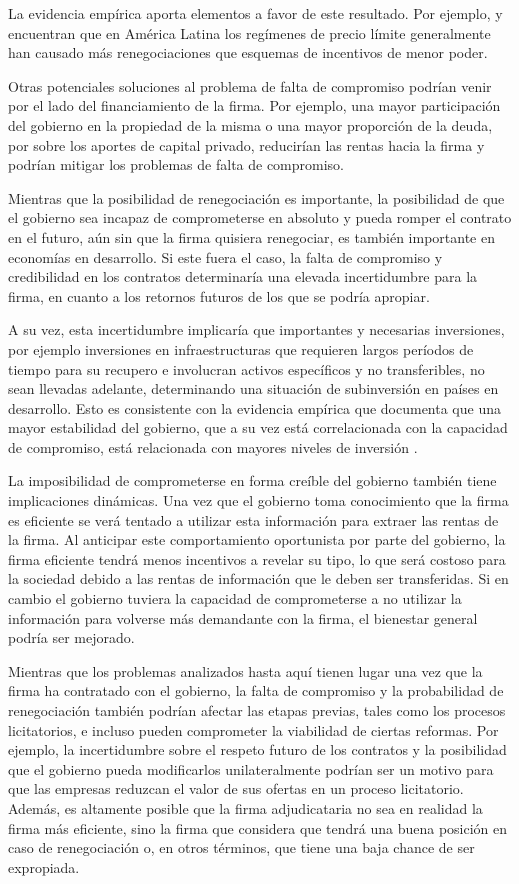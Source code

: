 \documentclass[
  12pt,
  spanish,
]{book}
\begin{document}
La evidencia empírica aporta elementos a favor de este resultado. Por ejemplo, \citet{Guasch2007} y \citet{Guasch2008} encuentran que en América Latina los regímenes de precio límite generalmente han causado más renegociaciones que esquemas de incentivos de menor poder.

Otras potenciales soluciones al problema de falta de compromiso podrían venir por el lado del financiamiento de la firma. Por ejemplo, una mayor participación del gobierno en la propiedad de la misma o una mayor proporción de la deuda, por sobre los aportes de capital privado, reducirían las rentas hacia la firma y podrían mitigar los problemas de falta de compromiso.

Mientras que la posibilidad de renegociación es importante, la posibilidad de que el gobierno sea incapaz de comprometerse en absoluto y pueda romper el contrato en el futuro, aún sin que la firma quisiera renegociar, es también importante en economías en desarrollo. Si este fuera el caso, la falta de compromiso y credibilidad en los contratos determinaría una elevada incertidumbre para la firma, en cuanto a los retornos futuros de los que se podría apropiar.

A su vez, esta incertidumbre implicaría que importantes y necesarias inversiones, por ejemplo inversiones en infraestructuras que requieren largos períodos de tiempo para su recupero e involucran activos específicos y no transferibles, no sean llevadas adelante, determinando una situación de subinversión en países en desarrollo. Esto es consistente con la evidencia empírica que documenta que una mayor estabilidad del gobierno, que a su vez está correlacionada con la capacidad de compromiso, está relacionada con mayores niveles de inversión \citep{Banerjee2006}.

La imposibilidad de comprometerse en forma creíble del gobierno también tiene implicaciones dinámicas. Una vez que el gobierno toma conocimiento que la firma es eficiente se verá tentado a utilizar esta información para extraer las rentas de la firma. Al anticipar este comportamiento oportunista por parte del gobierno, la firma eficiente tendrá menos incentivos a revelar su tipo, lo que será costoso para la sociedad debido a las rentas de información que le deben ser transferidas. Si en cambio el gobierno tuviera la capacidad de comprometerse a no utilizar la información para volverse más demandante con la firma, el bienestar general podría ser mejorado.

Mientras que los problemas analizados hasta aquí tienen lugar una vez que la firma ha contratado con el gobierno, la falta de compromiso y la probabilidad de renegociación también podrían afectar las etapas previas, tales como los procesos licitatorios, e incluso pueden comprometer la viabilidad de ciertas reformas. Por ejemplo, la incertidumbre sobre el respeto futuro de los contratos y la posibilidad que el gobierno pueda modificarlos unilateralmente podrían ser un motivo para que las empresas reduzcan el valor de sus ofertas en un proceso licitatorio. Además, es altamente posible que la firma adjudicataria no sea en realidad la firma más eficiente, sino la firma que considera que tendrá una buena posición en caso de renegociación o, en otros términos, que tiene una baja chance de ser expropiada.
\end{document}
